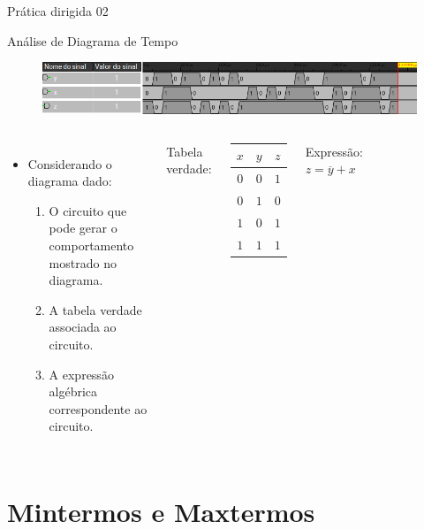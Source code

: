 \begin{frame}{Prática dirigida 02}
	\par Análise de Diagrama de Tempo
	\begin{figure}
		\centering
		\includegraphics[width=0.7\linewidth]{images/waveform02}
		\label{fig:waveform02}
	\end{figure}
	\begin{columns}
		\begin{itemize}
			\item Considerando o diagrama dado:
			\begin{enumerate}
				\item O circuito que pode gerar o comportamento mostrado no diagrama.
				\item A tabela verdade associada ao circuito.
				\item A expressão algébrica correspondente ao circuito.
			\end{enumerate}
		\end{itemize}
		\pause
		\par Tabela verdade:
		\begin{center}
			\begin{tabular}{cc|c}
				$x$&$y$&$z$\\
				\hline
				$0$&$0$&$1$\\
				$0$&$1$&$0$\\
				$1$&$0$&$1$\\
				$1$&$1$&$1$\\
			\end{tabular}
		\end{center}		
		\par Expressão:
		$z =  \overline{y} +x$
		\begin{figure}
			\centering
			
			\label{fig:exe09}
		\end{figure}
	\end{columns}
\end{frame}

\section{Mintermos e Maxtermos}

